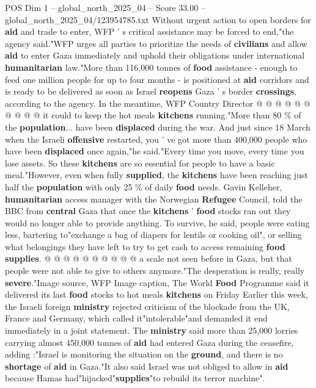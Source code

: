 \begin{textsample}{POS Dim 1 – global\_north\_2025\_04 – Score 33.00 – global\_north\_2025\_04/123954785.txt}
Without urgent action to open borders for \textbf{aid} and trade to enter, WFP ' s critical assistance may be forced to end,"the agency said."WFP urges all parties to prioritize the needs of \textbf{civilians} and allow \textbf{aid} to enter Gaza immediately and uphold their obligations under international \textbf{humanitarian} law."More than 116,000 tonnes of \textbf{food} assistance - enough to feed one million people for up to four months - is positioned at \textbf{aid} corridors and is ready to be delivered as soon as Israel \textbf{reopens} Gaza ' s border \textbf{crossings}, according to the agency.
In the meantime, WFP Country Director @ @ @ @ @ @ @ @ @ @ it could to keep the hot meals \textbf{kitchens} running."More than 80 \% of the \textbf{population}... have been \textbf{displaced} during the war.
And just since 18 March when the Israeli \textbf{offensive} restarted, you ' ve got more than 400,000 people who have been \textbf{displaced} once again,"he said."Every time you move, every time you lose assets.
So these \textbf{kitchens} are so essential for people to have a basic meal."However, even when fully \textbf{supplied}, the \textbf{kitchens} have been reaching just half the \textbf{population} with only 25 \% of daily \textbf{food} needs.
Gavin Kelleher, \textbf{humanitarian} access manager with the Norwegian \textbf{Refugee} Council, told the BBC from \textbf{central} Gaza that once the \textbf{kitchens} ' \textbf{food} stocks ran out they would no longer able to provide anything.
To survive, he said, people were eating less, bartering to"exchange a bag of diapers for lentils or cooking oil", or selling what belongings they have left to try to get cash to access remaining \textbf{food} \textbf{supplies}. @ @ @ @ @ @ @ @ @ @ a scale not seen before in Gaza, but that people were not able to give to others anymore."The desperation is really, really \textbf{severe}."Image source, WFP Image caption, The World \textbf{Food} Programme said it delivered its last \textbf{food} stocks to hot meals \textbf{kitchens} on Friday Earlier this week, the Israeli foreign \textbf{ministry} rejected criticism of the blockade from the UK, France and Germany, which called it"intolerable"and demanded it end immediately in a joint statement.
The \textbf{ministry} said more than 25,000 lorries carrying almost 450,000 tonnes of \textbf{aid} had entered Gaza during the ceasefire, adding :"Israel is monitoring the situation on the \textbf{ground}, and there is no \textbf{shortage} of \textbf{aid} in Gaza."It also said Israel was not obliged to allow in \textbf{aid} because Hamas had"hijacked"\textbf{supplies}"to rebuild its terror machine".

\end{textsample}
